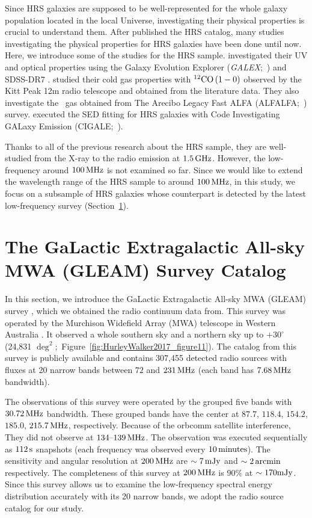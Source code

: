 Since HRS galaxies are supposed to be well-represented for the whole galaxy population located in the local Universe, investigating their physical properties is crucial to understand them.
After \citet{Boselli2010} published the HRS catalog, many studies investigating the physical properties for HRS galaxies have been done until now.
Here, we introduce some of the studies for the HRS sample.
\citet{Cortese2012} investigated their UV and optical properties using the Galaxy Evolution Explorer ({\it GALEX\/};~\citealt{Martin2005}) and SDSS-DR7 \citep{Abazajian2009}.
\citet{Boselli2014} studied their cold gas properties with $^{12}\mathrm{CO}\left(1-0\right)$ observed by the Kitt Peak 12m radio telescope and obtained from the literature data.
They also investigate the \nh~gas obtained from The Arecibo Legacy Fast ALFA (ALFALFA;~\citealt{Giovanelli2005, Haynes2011}) survey.
\citet{Ciesla2014} executed the SED fitting for HRS galaxies with Code Investigating GALaxy Emission (CIGALE;~\citealt{Noll2009}).

Thanks to all of the previous research about the HRS sample, they are well-studied from the X-ray to the radio emission at $1.5\,\mathrm{GHz}$.
However, the low-frequency around $100\,\mathrm{MHz}$ is not examined so far.
Since we would like to extend the wavelength range of the HRS sample to around $100\,\mathrm{MHz}$, in this study, we focus on a subsample of HRS galaxies whose counterpart is detected by the latest low-frequency survey (Section~\ref{sec:gleamsurvey}).



\section{The GaLactic Extragalactic All-sky MWA (GLEAM) Survey Catalog}\label{sec:gleamsurvey}

In this section, we introduce the GaLactic Extragalactic All-sky MWA (GLEAM) survey \citep{Hurley-Walker2017a}, which we obtained the radio continuum data from.
This survey was operated by the Murchison Widefield Array (MWA) telescope in Western Australia \citep{Tingay2013a}.
It observed a whole southern sky and a northern sky up to $+30^{\circ}$ (24,831 $\mathrm{\deg}^2$;~Figure~\ref{fig:HurleyWalker2017_figure11}).
The catalog from this survey is publicly available and contains 307,455 detected radio sources with fluxes at 20 narrow bands between $72$ and $231\,\mathrm{MHz}$ (each band has $7.68\,\mathrm{MHz}$ bandwidth).

The observations of this survey were operated by the grouped five bands with $30.72\,\mathrm{MHz}$ bandwidth.
These grouped bands have the center at $87.7$, $118.4$, $154.2$, $185.0$, $215.7\,\mathrm{MHz}$, respectively.
Because of the orbcomm satellite interference, They did not observe at $134\mbox{--}139\,\mathrm{MHz}$.
The observation was executed sequentially as $112\,\mathrm{s}$ snapshots (each frequency was observed every $10\,\mathrm{minutes}$).
The sensitivity and angular resolution at $200\,\mathrm{MHz}$ are $\sim 7\,\mathrm{mJy}$ and $\sim 2\,\mathrm{arcmin}$ respectively.
The completeness of this survey at $200\,\mathrm{MHz}$ is $90\%$ at $\sim 170\mathrm{mJy}$.
Since this survey allows us to examine the low-frequency spectral energy distribution accurately with its 20 narrow bands, we adopt the radio source catalog for our study.

